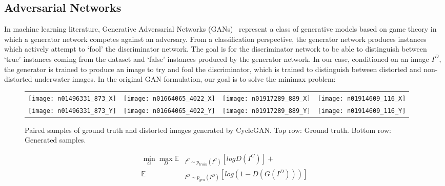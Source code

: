 \subsection{Adversarial Networks}
In machine learning literature, Generative Adversarial Networks 
(GANs)~\cite{goodfellow2014generative} represent a class of generative models based on game theory in which a generator network 
competes against an adversary. From a classification perspective, the generator network produces instances which actively attempt 
to `fool' the discriminator network. The goal is for the discriminator network to be able to distinguish between `true' 
instances coming from the dataset and `false' instances produced by the generator network.
In our case, conditioned on an image $I^D$, the generator is trained to produce an image to try and fool the 
discriminator, which is trained to distinguish between distorted and non-distorted underwater images. In the original
GAN formulation, our goal is to solve the minimax problem:

\begin{figure}
\centering
\begin{tabular}{p{1.7cm} p{1.7cm} p{1.7cm} p{1.7cm}}
   
   \texttt{[image: n01496331\_873\_X]} &
   \texttt{[image: n01664065\_4022\_X]} &
   \texttt{[image: n01917289\_889\_X]} &
   \texttt{[image: n01914609\_116\_X]} \\
   \texttt{[image: n01496331\_873\_Y]} &
   \texttt{[image: n01664065\_4022\_Y]} &
   \texttt{[image: n01917289\_889\_Y]} &
   \texttt{[image: n01914609\_116\_Y]} \\

\end{tabular}
\label{fig:cgan_samples}
\caption{Paired samples of ground truth and distorted images generated by CycleGAN. Top row: Ground truth.
Bottom row: Generated samples.}
\end{figure}


\begin{equation}
\begin{aligned}
   \min\limits_{G}\max\limits_{D} \mathbb{E} & _{I^C \sim p_{train}(I^C)} [logD(I^C)] + \\
   \mathbb{E} & _{I^D \sim p_{gen}(I^D)}[log(1 - D(G(I^D)))]
\end{aligned}
\end{equation}

